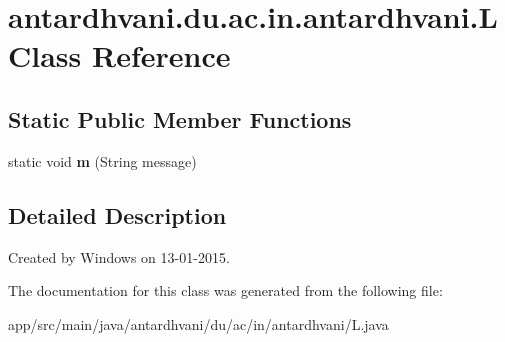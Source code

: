 \hypertarget{classantardhvani_1_1du_1_1ac_1_1in_1_1antardhvani_1_1_l}{}\section{antardhvani.\+du.\+ac.\+in.\+antardhvani.\+L Class Reference}
\label{classantardhvani_1_1du_1_1ac_1_1in_1_1antardhvani_1_1_l}
\subsection*{Static Public Member Functions}
\begin{DoxyCompactItemize}
\item 
\hypertarget{classantardhvani_1_1du_1_1ac_1_1in_1_1antardhvani_1_1_l_a49ef4dd88de45b35394156331af8030c}{}static void {\bfseries m} (String message)\label{classantardhvani_1_1du_1_1ac_1_1in_1_1antardhvani_1_1_l_a49ef4dd88de45b35394156331af8030c}

\end{DoxyCompactItemize}


\subsection{Detailed Description}
Created by Windows on 13-\/01-\/2015. 

The documentation for this class was generated from the following file\+:\begin{DoxyCompactItemize}
\item 
app/src/main/java/antardhvani/du/ac/in/antardhvani/L.\+java\end{DoxyCompactItemize}
